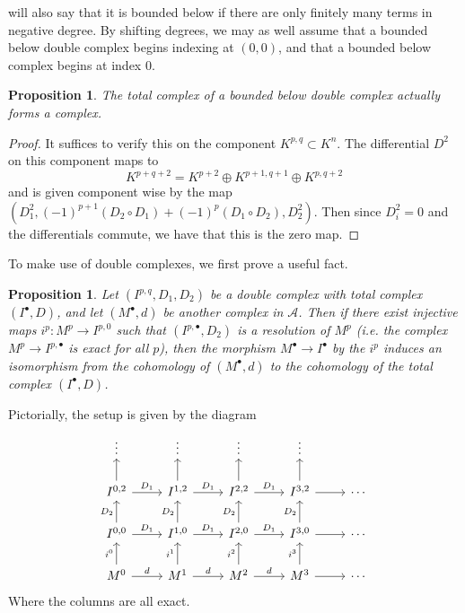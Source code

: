 \documentclass[psamsfonts, 12pt]{amsart}
\newtheorem{prop}[thm]{Proposition}
\theoremstyle{definition}
\theoremstyle{remark}
\begin{document}
will also say that it is bounded below if there are only finitely many
terms in negative degree. By shifting degrees, we may as well assume that
a bounded below double complex begins indexing at $(0,0)$, and that a bounded
below complex begins at index $0$.
%
\begin{prop}
The total complex of a bounded below double complex actually forms a complex.
\end{prop}
%
\begin{proof}
It suffices to verify this on the component $K^{p,q} \subset K^n$.
The differential $D^2$ on this component maps to
\[
K^{p+q+2} = K^{p+2} \oplus K^{p+1,q+1} \oplus K^{p,q+2}
\]
and is given component wise by the map
$(D_1^2, (-1)^{p+1}(D_2\circ D_1) + (-1)^p(D_1 \circ D_2), D_2^2)$.
Then since $D_i^2 = 0$ and the differentials commute, we have that this is the
zero map.
\end{proof}
%
To make use of double complexes, we first prove a useful fact.
%
\begin{prop}
Let $(I^{p,q},D_1,D_2)$ be a double complex with total complex $(I^\bullet, D)$,
and let $(M^\bullet, d)$ be another complex in $\mathcal{A}$. Then if there
exist injective maps $i^p : M^p \to I^{p,0}$ such that $(I^{p,\bullet},D_2)$ is a
resolution of $M^p$ (i.e. the complex $M^p \to I^{p,\bullet}$ is exact
for all $p$), then the morphism $M^\bullet \to I^\bullet$ by the $i^p$ induces
an isomorphism from the cohomology of $(M^\bullet,d)$ to the cohomology of the
total complex $(I^\bullet, D)$.
\end{prop}
%
Pictorially, the setup is given by the diagram
\[\begin{tikzcd}
\vdots & \vdots & \vdots & \vdots \\
I^{0,2} \ar[u] \ar[r, "D_1"] & I^{1,2} \ar[u] \ar[r, "D_1"]
& I^{2,2} \ar[u] \ar[r, "D_1"] & I^{3,2} \ar[u] \ar[r] & \cdots \\
I^{0,0} \ar[u, "D_2"] \ar[r, "D_1"] & I^{1,0} \ar[u, "D_2"] \ar[r, "D_1"]
& I^{2,0} \ar[u, "D_2"] \ar[r, "D_1"] & I^{3,0} \ar[u, "D_2"] \ar[r] & \cdots \\
M^0 \ar[u, "i^0"] \ar[r, "d"] & M^1 \ar[u, "i^1"] \ar[r, "d"]
& M^2 \ar[u, "i^2"] \ar[r, "d"] & M^3 \ar[u, "i^3"] \ar[r] & \cdots
\end{tikzcd}\]
Where the columns are all exact.
%
\end{document}
